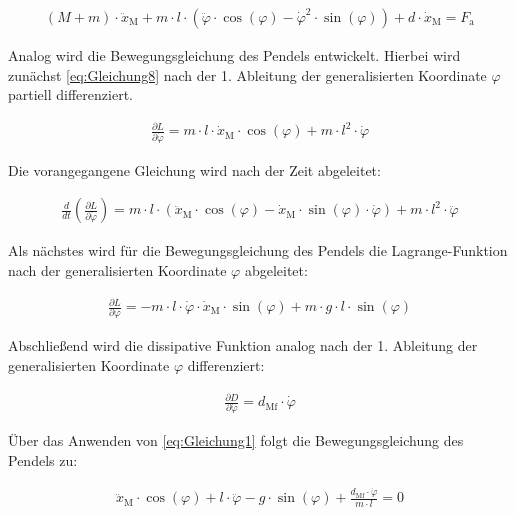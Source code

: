 \begin{align}\label{eq:Gleichung13}
    (M + m) \cdot \ddot x_{\mathrm{M}} + m \cdot l \cdot \left( \ddot \varphi \cdot \cos({\varphi}) - \dot \varphi^2 \cdot \sin({\varphi})\right) + d \cdot \dot x_{\mathrm{M}} = F_{\mathrm{a}}
\end{align}

Analog wird die Bewegungsgleichung des Pendels entwickelt. Hierbei wird zunächst \autoref{eq:Gleichung8} nach der 1. Ableitung der generalisierten Koordinate $\varphi$ partiell differenziert.

\begin{align}\label{eq:Gleichung14}
    \frac{\partial L}{\partial \dot{\varphi}} = m \cdot l \cdot \dot{x}_{\mathrm{M}} \cdot \cos(\varphi) + m \cdot l^2 \cdot \dot{\varphi}
\end{align}

Die vorangegangene Gleichung wird nach der Zeit abgeleitet:

\begin{align}\label{eq:Gleichung15}
    \frac{d}{dt}\left(\frac{\partial L}{\partial \dot{\varphi}}\right) = m \cdot l \cdot \left(\ddot{x}_{\mathrm{M}} \cdot  \cos(\varphi) - \dot{x}_{\mathrm{M}} \cdot \sin(\varphi) \cdot \dot{\varphi}\right) + m \cdot l^2 \cdot \ddot{\varphi}
\end{align}

Als nächstes wird für die Bewegungsgleichung des Pendels die Lagrange-Funktion nach der generalisierten Koordinate $\varphi$ abgeleitet:

\begin{align}\label{eq:Gleichung16}
    \frac{\partial L}{\partial \varphi} = -m \cdot l \cdot \dot{\varphi} \cdot \dot{x}_{\mathrm{M}} \cdot \sin(\varphi) + m \cdot g \cdot l \cdot \sin(\varphi)
\end{align}

Abschließend wird die dissipative Funktion analog nach der 1. Ableitung der generalisierten Koordinate $\varphi$ differenziert:

\begin{align}\label{eq:Gleichung17}
    \frac{\partial D}{\partial \dot{\varphi}} = d_{\mathrm{Mf}} \cdot \dot{\varphi}
\end{align}

Über das Anwenden von \autoref{eq:Gleichung1} folgt die Bewegungsgleichung des Pendels zu:

\begin{align}\label{eq:Gleichung18}
    \ddot{x}_{\mathrm{M}} \cdot \cos(\varphi) + l \cdot \ddot{\varphi} - g \cdot \sin(\varphi) + \frac{d_{\mathrm{Mf}} \cdot \dot{\varphi}}{m \cdot l} = 0
\end{align}